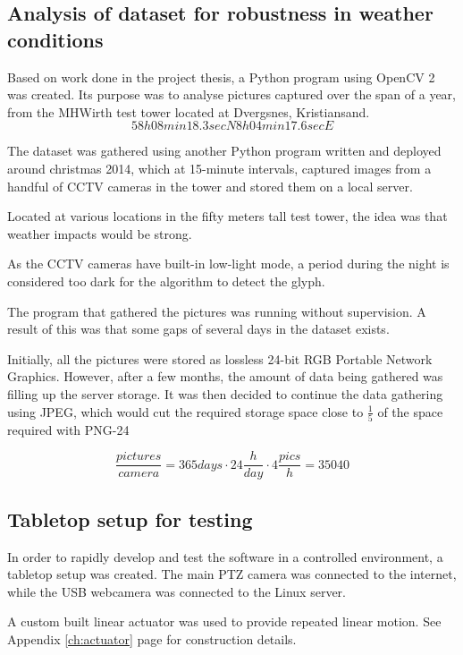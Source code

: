 \subsection{Analysis of dataset for robustness in weather conditions}
Based on work done in the project thesis, a Python program using OpenCV 2 was created. Its purpose was to analyse pictures captured over the span of a year, from the MHWirth test tower located at Dvergsnes, Kristiansand.
\begin{equation}
58h 08min 18.3sec N 8h 04min 17.6sec E
\end{equation}

The dataset was gathered using another Python program written and deployed around christmas 2014, which at 15-minute intervals, captured images from a handful of CCTV cameras in the tower and stored them on a local server.

Located at various locations in the fifty meters tall test tower, the idea was that weather impacts would be strong.

As the CCTV cameras have built-in low-light mode, a period during the night is considered too dark for the algorithm to detect the glyph.

The program that gathered the pictures was running without supervision. A result of this was that some gaps of several days in the dataset exists.

Initially, all the pictures were stored as lossless 24-bit RGB Portable Network Graphics. However, after a few months, the amount of data being gathered was filling up the server storage. It was then decided to continue the data gathering using JPEG, which would cut the required storage space close to $\frac{1}{5}$ of the space required with PNG-24

\begin{equation}
\frac{pictures}{camera}=365 days\cdot 24\frac{h}{day}\cdot 4\frac{pics}{h}=35040
\end{equation}

\subsection{Tabletop setup for testing}
In order to rapidly develop and test the software in a controlled environment, a tabletop setup was created. The main PTZ camera was connected to the internet, while the USB webcamera was connected to the Linux server.

A custom built linear actuator was used to provide repeated linear motion. See Appendix \ref{ch:actuator} page \pageref{ch:actuator} for construction details.

